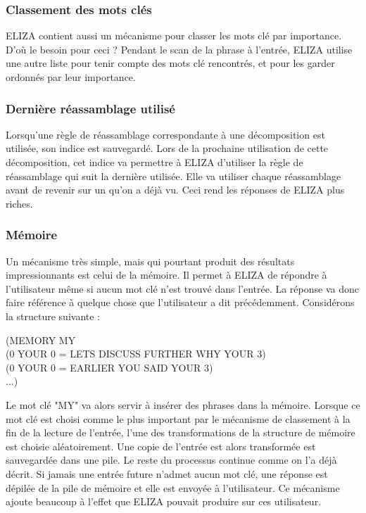 \documentclass[11pt, a4paper]{report}
\begin{document}
  \subsubsection{Classement des mots clés}
  ELIZA contient aussi un mécanisme pour classer les mots clé par importance. D'où le besoin 
  pour ceci ?  Pendant le scan de la phrase à l'entrée, 
  ELIZA utilise une autre liste pour tenir compte des mots clé rencontrés, et pour les garder 
  ordonnés par leur importance.
  
  \subsubsection{Dernière réassamblage utilisé}
  Lorsqu'une règle de réassamblage correspondante à une décomposition 
  est utilisée, son indice est sauvegardé. 
  Lors de la prochaine utilisation de cette décomposition, cet indice 
  va permettre à ELIZA d'utiliser la règle de réassamblage qui suit la dernière utilisée. 
  Elle va utiliser chaque réassamblage avant de revenir sur un qu'on a déjà vu. 
  Ceci rend les réponses de ELIZA plus riches.
  
  \subsubsection{Mémoire}
  Un mécanisme très simple, mais qui pourtant produit des résultats impressionnants est celui 
  de la mémoire. Il permet à ELIZA de répondre à l'utilisateur même si aucun mot clé n'est trouvé 
  dans l'entrée. La réponse va donc faire référence à quelque chose que l'utilisateur a dit 
  précédemment. Considérons la structure suivante : 

  \begin{center}
    (MEMORY MY \\
    (0 YOUR 0 = LETS DISCUSS FURTHER WHY YOUR 3) \\
    (0 YOUR 0 = EARLIER YOU SAID YOUR 3) \\
    ...)
  \end{center}

  Le mot clé "MY" va alors servir à insérer des phrases dans la mémoire. Lorsque ce mot clé 
  est choisi comme le plus important par le mécanisme de classement à la fin de la lecture 
  de l'entrée, l'une des transformations de la structure de mémoire est choisie aléatoirement. 
  Une copie de l'entrée est alors transformée est sauvegardée dans une pile. Le reste du processus 
  continue comme on l'a déjà décrit. Si jamais une entrée future n'admet aucun mot clé, une réponse 
  est dépilée de la pile de mémoire et elle est envoyée à l'utilisateur. Ce mécanisme ajoute 
  beaucoup à l'effet que ELIZA pouvait produire sur ces utilisateur. 
\end{document}
